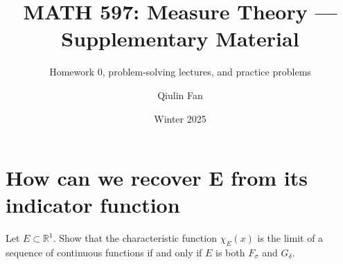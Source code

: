 \documentclass{qlnotes-export}
\title{MATH 597: Measure Theory --- Supplementary Material}
\subtitle{Homework 0, problem-solving lectures, and practice problems}
\author{Qiulin Fan}
\date{Winter 2025}
\begin{document}
\mainmatter
\chapter{How can we recover E from its indicator function}\label{how-can-we-recover-e-from-its-indicator-function}

Let \(E \subset {\mathbb{R}}^{1}\). Show that the characteristic function \(\chi_{E}(x)\) is the limit of a sequence of continuous functions if and only if \(E\) is both \(F_{\sigma}\) and \(G_{\delta}\).
\end{document}
